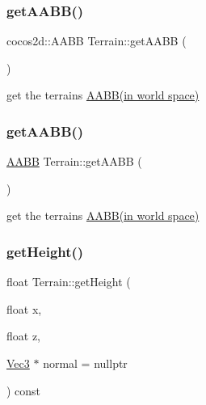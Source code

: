 \subsubsection{\texorpdfstring{get\+A\+A\+B\+B()}{getAABB()}\hspace{0.1cm}{\footnotesize\ttfamily [1/2]}}
{\footnotesize\ttfamily cocos2d\+::\+A\+A\+BB Terrain\+::get\+A\+A\+BB (\begin{DoxyParamCaption}{ }\end{DoxyParamCaption})}

get the terrain\textquotesingle{}s \hyperlink{classAABB}{A\+A\+B\+B(in world space)} \mbox{\label{classTerrain_a395a7b07be9d78fae2920bf9d2e51ace}} 
\subsubsection{\texorpdfstring{get\+A\+A\+B\+B()}{getAABB()}\hspace{0.1cm}{\footnotesize\ttfamily [2/2]}}
{\footnotesize\ttfamily \hyperlink{classAABB}{A\+A\+BB} Terrain\+::get\+A\+A\+BB (\begin{DoxyParamCaption}{ }\end{DoxyParamCaption})}

get the terrain\textquotesingle{}s \hyperlink{classAABB}{A\+A\+B\+B(in world space)} \mbox{\label{classTerrain_ace35b0aef83e27883476dfb44bf473aa}} 
\subsubsection{\texorpdfstring{get\+Height()}{getHeight()}\hspace{0.1cm}{\footnotesize\ttfamily [1/4]}}
{\footnotesize\ttfamily float Terrain\+::get\+Height (\begin{DoxyParamCaption}\item[{float}]{x,  }\item[{float}]{z,  }\item[{\hyperlink{classVec3}{Vec3} $\ast$}]{normal = {\ttfamily nullptr} }\end{DoxyParamCaption}) const}


